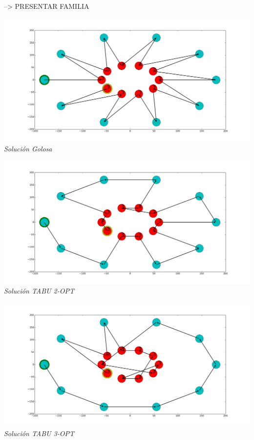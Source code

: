 --> PRESENTAR FAMILIA

\vspace*{0.3cm} \vspace*{0.3cm}
  \begin{center}
 \includegraphics[scale=0.3]{./EJ4/fam7goloso.png}\\
 {            \textit{Soluci\'on Golosa}}
  \end{center}
  \vspace*{0.3cm}

\vspace*{0.3cm} \vspace*{0.3cm}
  \begin{center}
 \includegraphics[scale=0.3]{./EJ4/fam72opt.png}\\
 {            \textit{Soluci\'on TABU 2-OPT}}
  \end{center}
  \vspace*{0.3cm}

\vspace*{0.3cm} \vspace*{0.3cm}
  \begin{center}
 \includegraphics[scale=0.3]{./EJ4/fam73opt.png}\\
 {            \textit{Soluci\'on TABU 3-OPT}}
  \end{center}
  \vspace*{0.3cm}

